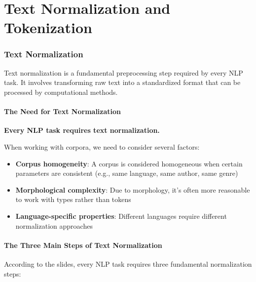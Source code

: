 \documentclass[11pt,a4paper]{article}
\theoremstyle{definition}
\theoremstyle{plain}
\theoremstyle{remark}
\begin{document}
\newpage
\part{Text Normalization and Tokenization}

\section{Text Normalization}

Text normalization is a fundamental preprocessing step required by every NLP task. It involves transforming raw text into a standardized format that can be processed by computational methods.

\subsection{The Need for Text Normalization}

\textbf{Every NLP task requires text normalization.}

When working with corpora, we need to consider several factors:
\begin{itemize}
    \item \textbf{Corpus homogeneity}: A corpus is considered homogeneous when certain parameters are consistent (e.g., same language, same author, same genre)
    \item \textbf{Morphological complexity}: Due to morphology, it's often more reasonable to work with types rather than tokens
    \item \textbf{Language-specific properties}: Different languages require different normalization approaches
\end{itemize}

\subsection{The Three Main Steps of Text Normalization}

According to the slides, every NLP task requires three fundamental normalization steps:
\end{document}
